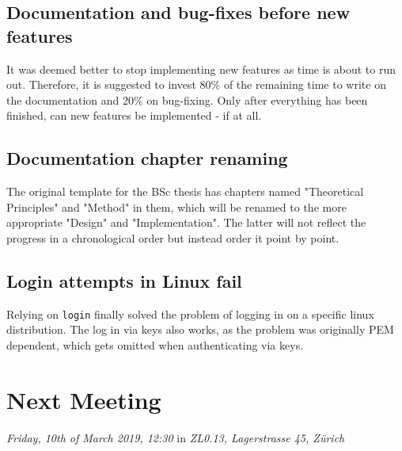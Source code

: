 \documentclass[10pt,a4paper,twoside,english,minutes]{zhawreprt}
\begin{document}
\subsection{Documentation and bug-fixes before new features}
It was deemed better to stop implementing new features as time is about to run out. Therefore, it is suggested to invest 80\% of the remaining time to write on the documentation and 20\% on bug-fixing. Only after everything has been finished, can new features be implemented - if at all.

\subsection{Documentation chapter renaming}
The original template for the BSc thesis has chapters named "Theoretical Principles" and "Method" in them, which will be renamed to the more appropriate "Design" and "Implementation". The latter will not reflect the progress in a chronological order but instead order it point by point.

\subsection{Login attempts in Linux fail}
Relying on \texttt{login} finally solved the problem of logging in on a specific linux distribution. The log in via keys also works, as the problem was originally PEM dependent, which gets omitted when authenticating via keys.

\section*{Next Meeting}
\textit{Friday, 10th of March 2019, 12:30} in \textit{ZL0.13, Lagerstrasse 45, Zürich}
\end{document}
